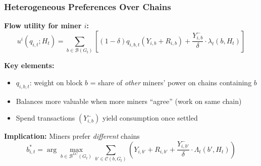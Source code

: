 \documentclass[aspectratio=169, 12pt]{beamer}
\begin{document}
\begin{frame}
\frametitle{Heterogeneous Preferences Over Chains}

\textbf{Flow utility for miner $i$:}
\[
u^i(q_{i,t}; H_t) = \sum_{b \in \mathcal{B}(G_t)} \left[ (1-\delta) q_{i,b,t}(Y_{i,b} + R_{i,b}) + \frac{Y_{i,b}^-}{\delta} \cdot \lambda_t(b, H_t) \right]
\]

\vspace{0.5em}

\textbf{Key elements:}
\begin{itemize}
    \item $q_{i,b,t}$: weight on block $b$ = share of \emph{other} miners' power on chains containing $b$
    \item Balances more valuable when more miners ``agree'' (work on same chain)
    \item Spend transactions $(Y_{i,b}^-)$ yield consumption once settled
\end{itemize}

\vspace{0.5em}

\textbf{Implication:} Miners prefer \emph{different} chains
\[
b^*_{i,t} = \arg\max_{b \in \mathcal{B}^{LC}(G_t)} \sum_{b' \in \mathcal{C}(b, G_t)} \left( Y_{i,b'} + R_{i,b'} + \frac{Y_{i,b'}^-}{\delta} \cdot \Lambda_t(b', H_t) \right)
\]

\end{frame}
\end{document}
